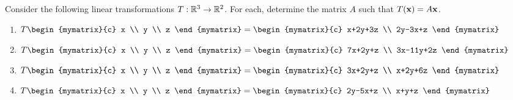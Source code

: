 \begin{enumialphparenastyle}
\begin{ex}
  Consider the following linear transformations
  $T:\mathbb{R}^{3}\rightarrow \mathbb{R}^{2}$.  For each, determine the matrix $A$
  such that $T(\mbox{\bf x})=A\mbox{\bf x}$.
  \begin{enumerate}
  \item $T\begin{mymatrix}{c}
      x \\
      y \\
      z
    \end{mymatrix} =\begin{mymatrix}{c}
      x+2y+3z \\
      2y-3x+z
    \end{mymatrix} $

  \item $T\begin{mymatrix}{c}
      x \\
      y \\
      z
    \end{mymatrix} =\begin{mymatrix}{c}
      7x+2y+z \\
      3x-11y+2z
    \end{mymatrix} $

  \item $T\begin{mymatrix}{c}
      x \\
      y \\
      z
    \end{mymatrix} =\begin{mymatrix}{c}
      3x+2y+z \\
      x+2y+6z
    \end{mymatrix} $

  \item $T\begin{mymatrix}{c}
      x \\
      y \\
      z
    \end{mymatrix} =\begin{mymatrix}{c}
      2y-5x+z \\
      x+y+z
    \end{mymatrix} $
  \end{enumerate}
\end{ex}


\end{enumialphparenastyle}
